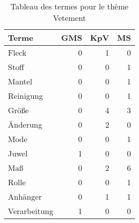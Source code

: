 
\begin{table}[ht]
\centering
\caption{Tableau des termes pour le thème Vetement}
\label{tab:Vetement}
\begin{tabular}{lrrr}
\hline
 Terme        &   GMS &   KpV &   MS \\
\hline
 Fleck        &     0 &     1 &    0 \\
 Stoff        &     0 &     0 &    1 \\
 Mantel       &     0 &     0 &    1 \\
 Reinigung    &     0 &     0 &    1 \\
 Größe        &     0 &     4 &    3 \\
 Änderung     &     0 &     2 &    0 \\
 Mode         &     0 &     0 &    1 \\
 Juwel        &     1 &     0 &    0 \\
 Maß          &     0 &     2 &    6 \\
 Rolle        &     0 &     0 &    1 \\
 Anhänger     &     0 &     1 &    1 \\
 Verarbeitung &     1 &     0 &    0 \\
\hline
\end{tabular}
\end{table}
    